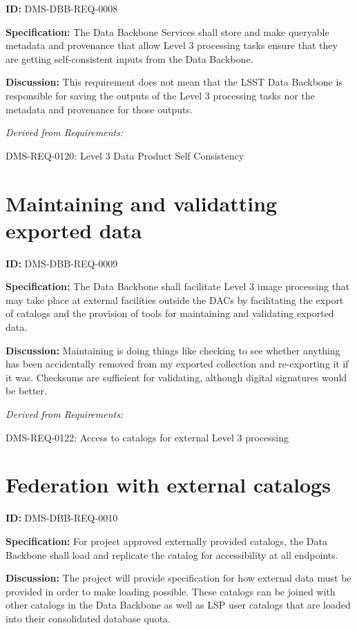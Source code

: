 \documentclass[SE,toc,lsstdraft]{lsstdoc}
\begin{document}
\label{DMS-DBB-REQ-0008}
\textbf{ID:} DMS-DBB-REQ-0008

\textbf{Specification:}
The Data Backbone Services shall store and make queryable metadata and provenance that allow Level 3 processing tasks ensure that they are getting self-consistent inputs from the Data Backbone.

\textbf{Discussion:}
This requirement does not mean that the LSST Data Backbone is responsible for saving the outputs of the Level 3 processing tasks nor the metadata and provenance for those outputs.

\emph{Derived from Requirements:}

DMS-REQ-0120:
Level 3 Data Product Self Consistency \newline

\section{Maintaining and validatting exported data}

\label{DMS-DBB-REQ-0009}
\textbf{ID:} DMS-DBB-REQ-0009

\textbf{Specification:}
The Data Backbone shall facilitate Level 3 image processing that may take place at external facilities outside the DACs by facilitating the export of catalogs and the provision of tools for maintaining and validating exported data.

\textbf{Discussion:}
Maintaining is doing things like checking to see whether anything has been accidentally removed from my exported collection and re-exporting it if it was.  Checksums are sufficient for validating, although digital signatures would be better.

\emph{Derived from Requirements:}

DMS-REQ-0122:
Access to catalogs for external Level 3 processing \newline

\section{Federation with external catalogs}

\label{DMS-DBB-REQ-0010}
\textbf{ID:} DMS-DBB-REQ-0010

\textbf{Specification:}
For project approved externally provided catalogs, the Data Backbone shall load and replicate the catalog for accessibility at all endpoints.

\textbf{Discussion:}
The project will provide specification for how external data must be provided in order to make loading possible.    These catalogs can be joined with other catalogs in the Data Backbone as well as LSP user catalogs that are loaded into their consolidated database quota.
\end{document}
